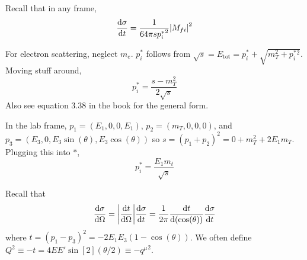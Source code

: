 \documentclass[a4paper,twoside,master.tex]{subfiles}
\begin{document}

Recall that in any frame,
\begin{equation}
    \dv{\sigma}{t} = \frac{1}{64 \pi s {p_i^*}^2} \abs{M_{f i}}^2
\end{equation}

For electron scattering, neglect $ m_e $. $ p_i^* $ follows from $ \sqrt{s} = E_{\text{tot}} = p_i^* + \sqrt{m_T^2 + p_i^*^2} $. Moving stuff around,
\begin{equation}
    p_i^* = \frac{s - m_T^2}{2 \sqrt{s}}\tag{\ast}
\end{equation}
Also see equation 3.38 in the book for the general form.

In the lab frame, $ p_1 = (E_1,0,0,E_1) $, $ p_2 = (m_T, 0, 0, 0) $, and $ p_3 = (E_3,0,E_3 \sin(\theta), E_3 \cos(\theta)) $ so $ s = (p_1 + p_2)^2 = 0 + m_T^2 + 2 E_1 m_T $. Plugging this into $ \ast $,
\begin{equation}
    p_i^* = \frac{E_1 m_t}{\sqrt{s}} \tag{\ast\ast}
\end{equation}

Recall that
\begin{equation}
    \dv{\sigma}{\Omega} = \abs{\dv{t}{\Omega}} \dv{\sigma}{t} = \frac{1}{2 \pi} \dv{t}{(\cos(\theta))} \dv{\sigma}{t}
\end{equation}
where $ t = (p_1 - p_3)^2 = -2 E_1 E_3(1 - \cos(\theta)) $. We often define $ Q^2 \equiv -t = 4 E E' \sin[2](\theta / 2) \equiv - {q^{\mu}}^2 $.
\end{document}

